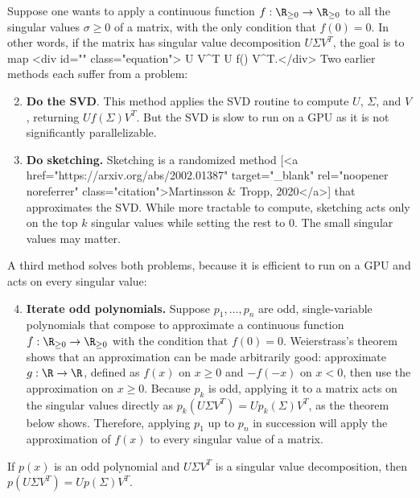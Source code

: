Suppose one wants to apply a continuous function $f : \R_{\geq0} \to \R_{\geq0}$ to all the singular values $\sigma \geq 0$ of a matrix, with the only condition that $f(0) = 0$. In other words, if the matrix has singular value decomposition $U \Sigma V^T$, the goal is to map <div id="" class="equation">    U \Sigma V^T \mapsto U f(\Sigma) V^T.</div> Two earlier methods each suffer from a problem:

\begin{enumerate}
    \setcounter{enumi}{1}
    \item \textbf{Do the SVD}. This method applies the SVD routine to compute $U$, $\Sigma$, and $V$, returning $Uf(\Sigma)V^T$. But the SVD is slow to run on a GPU as it is not significantly parallelizable.
    \item \textbf{Do sketching.} Sketching is a randomized method [<a href="https://arxiv.org/abs/2002.01387" target="_blank" rel="noopener noreferrer" class="citation">Martinsson & Tropp, 2020</a>] that approximates the SVD. While more tractable to compute, sketching acts only on the top $k$ singular values while setting the rest to $0$. The small singular values may matter.
\end{enumerate}

A third method solves both problems, because it is efficient to run on a GPU and acts on every singular value:

\begin{enumerate}
    \setcounter{enumi}{3}
    \item \textbf{Iterate odd polynomials.} Suppose $p_1, \dots, p_n$ are odd, single-variable polynomials that compose to approximate a continuous function $f : \R_{\geq0} \to \R_{\geq0}$ with the condition that $f(0) = 0$. Weierstrass's theorem shows that an approximation can be made arbitrarily good: approximate $g : \R \to \R$, defined as $f(x)$ on $x \geq 0$ and $-f(-x)$ on $x < 0$, then use the approximation on $x \geq 0$. Because $p_k$ is odd, applying it to a matrix acts on the singular values directly as $p_k(U \Sigma V^T) = U p_k(\Sigma) V^T$, as the theorem below shows. Therefore, applying $p_1$ up to $p_n$ in succession will apply the approximation of $f(x)$ to every singular value of a matrix.
\end{enumerate}

\begin{theorembox}
    If $p(x)$ is an odd polynomial and $U \Sigma V^T$ is a singular value decomposition, then $p(U \Sigma V^T) = U p(\Sigma) V^T$.
\end{theorembox}

